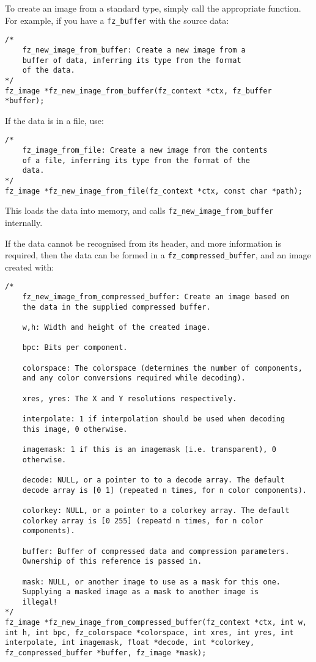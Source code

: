 \documentclass[oneside]{book}
\begin{document}
To create an image from a standard type, simply call the appropriate function. For example, if you have a \texttt{fz\_buffer} with the source data:

\begin{lstlisting}
/*
	fz_new_image_from_buffer: Create a new image from a
	buffer of data, inferring its type from the format
	of the data.
*/
fz_image *fz_new_image_from_buffer(fz_context *ctx, fz_buffer *buffer);
\end{lstlisting}

If the data is in a file, use:

\begin{lstlisting}
/*
	fz_image_from_file: Create a new image from the contents
	of a file, inferring its type from the format of the
	data.
*/
fz_image *fz_new_image_from_file(fz_context *ctx, const char *path);
\end{lstlisting}

This loads the data into memory, and calls \texttt{fz\_new\_image\_from\_buffer} internally.

If the data cannot be recognised from its header, and more information is required, then the data can be formed in a \texttt{fz\_compressed\_buffer}, and an image created with:

\begin{lstlisting}
/*
	fz_new_image_from_compressed_buffer: Create an image based on
	the data in the supplied compressed buffer.

	w,h: Width and height of the created image.

	bpc: Bits per component.

	colorspace: The colorspace (determines the number of components,
	and any color conversions required while decoding).

	xres, yres: The X and Y resolutions respectively.

	interpolate: 1 if interpolation should be used when decoding
	this image, 0 otherwise.

	imagemask: 1 if this is an imagemask (i.e. transparent), 0
	otherwise.

	decode: NULL, or a pointer to to a decode array. The default
	decode array is [0 1] (repeated n times, for n color components).

	colorkey: NULL, or a pointer to a colorkey array. The default
	colorkey array is [0 255] (repeatd n times, for n color
	components).

	buffer: Buffer of compressed data and compression parameters.
	Ownership of this reference is passed in.

	mask: NULL, or another image to use as a mask for this one.
	Supplying a masked image as a mask to another image is
	illegal!
*/
fz_image *fz_new_image_from_compressed_buffer(fz_context *ctx, int w, int h, int bpc, fz_colorspace *colorspace, int xres, int yres, int interpolate, int imagemask, float *decode, int *colorkey, fz_compressed_buffer *buffer, fz_image *mask);
\end{lstlisting}
\end{document}
